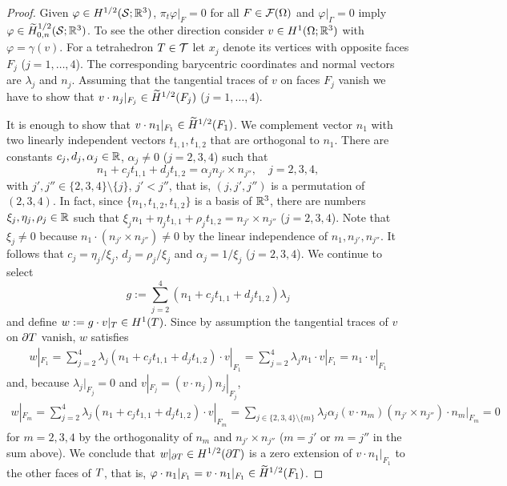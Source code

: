 \documentclass[11pt]{article}
\begin{document}
\begin{proof}
Given $\varphi\in H^{1/2}(\mathcal{S};\mathbb{R}^3)$, $\pi_t\varphi|_F=0$ for all $F\in\mathcal{F}(\Omega)$
and $\varphi|_\Gamma=0$ imply $\varphi\in \widetilde H^{1/2}_{0,n}(\mathcal{S};\mathbb{R}^3)$.
To see the other direction consider $v\in H^1(\Omega;\mathbb{R}^3)$ with $\varphi=\gamma(v)$.
For a tetrahedron $T\in\mathcal{T}$ let $x_j$ denote its vertices with opposite faces
$F_j$ ($j=1,\ldots,4$).
The corresponding barycentric coordinates and normal vectors are
$\lambda_j$ and $n_j$. Assuming that the tangential traces of $v$ on faces $F_j$ vanish
we have to show that $v\cdot n_j|_{F_j}\in\widetilde H^{1/2}(F_j)$ ($j=1,\ldots,4$).

It is enough to show that $v\cdot n_1|_{F_1}\in\widetilde H^{1/2}(F_1)$.
We complement vector $n_1$ with two linearly independent
vectors $t_{1,1},t_{1,2}$ that are orthogonal to $n_1$.
There are constants $c_j,d_j,\alpha_j\in \mathbb{R}$, $\alpha_j\not=0$ ($j=2,3,4$) such that
\[
   n_1+c_j t_{1,1}+d_j t_{1,2}=\alpha_j n_{j'}\times n_{j''},
   \quad j=2,3,4,
\]
with $j',j''\in\{2,3,4\}\setminus\{j\}$, $j'<j''$, that is,
$(j,j',j'')$ is a permutation of $(2,3,4)$.
In fact, since $\{n_1,t_{1,2},t_{1,2}\}$ is a basis of $\mathbb{R}^3$,
there are numbers $\xi_j,\eta_j,\rho_j\in\mathbb{R}$ such that
$\xi_j n_1+\eta_j t_{1,1}+\rho_j t_{1,2}=n_{j'}\times n_{j''}$ ($j=2,3,4$).
Note that $\xi_j\not=0$ because $n_1\cdot(n_{j'}\times n_{j''})\not=0$
by the linear independence of $n_1,n_{j'},n_{j''}$.
It follows that $c_j=\eta_j/\xi_j$, $d_j=\rho_j/\xi_j$ and $\alpha_j=1/\xi_j$ ($j=2,3,4$).
%
We continue to select
\[
   g:= \sum_{j=2}^4 (n_1+c_j t_{1,1}+d_j t_{1,2})\lambda_j
\]
and define
$w:=g\cdot v|_T\in H^1(T)$. Since by assumption the tangential traces
of $v$ on $\partial T$ vanish, $w$ satisfies
\begin{align*}
   w|_{F_1}= \sum_{j=2}^4 \lambda_j(n_1+c_j t_{1,1}+d_j t_{1,2})\cdot v|_{F_1}
           = \sum_{j=2}^4 \lambda_j n_1\cdot v|_{F_1} = n_1\cdot v|_{F_1}
\end{align*}
and, because $\lambda_j|_{F_j}=0$ and $v|_{F_j}=(v\cdot n_j) n_j|_{F_j}$,
\begin{align*}
   w|_{F_m}= \sum_{j=2}^4 \lambda_j(n_1+c_j t_{1,1}+d_j t_{1,2})\cdot v|_{F_m}
           = \sum_{j\in\{2,3,4\}\setminus\{m\}}
             \lambda_j\alpha_j(v\cdot n_m) (n_{j'}\times n_{j''})\cdot n_m|_{F_m}
           = 0
\end{align*}
for $m=2,3,4$ by the orthogonality of $n_m$ and $n_{j'}\times n_{j''}$
($m=j'$ or $m=j''$ in the sum above).
We conclude that $w|_{\partial T}\in H^{1/2}(\partial T)$
is a zero extension of $v\cdot n_1|_{F_1}$ to the other faces of $T$,
that is, $\varphi\cdot n_1|_{F_1}=v\cdot n_1|_{F_1}\in\widetilde H^{1/2}(F_1)$.
\end{proof}
\end{document}
